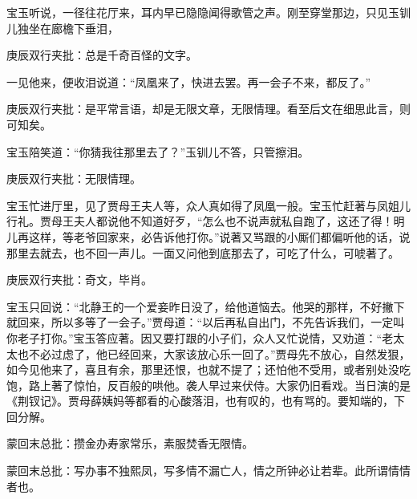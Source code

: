 \begin{parag}
    宝玉听说，一径往花厅来，耳内早已隐隐闻得歌管之声。刚至穿堂那边，只见玉钏儿独坐在廊檐下垂泪，\begin{note}庚辰双行夹批：总是千奇百怪的文字。\end{note}一见他来，便收泪说道：“凤凰来了，快进去罢。再一会子不来，都反了。”\begin{note}庚辰双行夹批：是平常言语，却是无限文章，无限情理。看至后文在细思此言，则可知矣。\end{note}宝玉陪笑道：“你猜我往那里去了？”玉钏儿不答，只管擦泪。\begin{note}庚辰双行夹批：无限情理。\end{note}宝玉忙进厅里，见了贾母王夫人等，众人真如得了凤凰一般。宝玉忙赶著与凤姐儿行礼。贾母王夫人都说他不知道好歹，“怎么也不说声就私自跑了，这还了得！明儿再这样，等老爷回家来，必告诉他打你。”说著又骂跟的小厮们都偏听他的话，说那里去就去，也不回一声儿。一面又问他到底那去了，可吃了什么，可唬著了。\begin{note}庚辰双行夹批：奇文，毕肖。\end{note}宝玉只回说：“北静王的一个爱妾昨日没了，给他道恼去。他哭的那样，不好撇下就回来，所以多等了一会子。”贾母道：“以后再私自出门，不先告诉我们，一定叫你老子打你。”宝玉答应著。因又要打跟的小子们，众人又忙说情，又劝道：“老太太也不必过虑了，他已经回来，大家该放心乐一回了。”贾母先不放心，自然发狠，如今见他来了，喜且有余，那里还恨，也就不提了；还怕他不受用，或者别处没吃饱，路上著了惊怕，反百般的哄他。袭人早过来伏侍。大家仍旧看戏。当日演的是《荆钗记》。贾母薛姨妈等都看的心酸落泪，也有叹的，也有骂的。要知端的，下回分解。
\end{parag}


\begin{parag}
    \begin{note}蒙回末总批：攒金办寿家常乐，素服焚香无限情。\end{note}
\end{parag}


\begin{parag}
    \begin{note}蒙回末总批：写办事不独熙凤，写多情不漏亡人，情之所钟必让若辈。此所谓情情者也。\end{note}
\end{parag}

